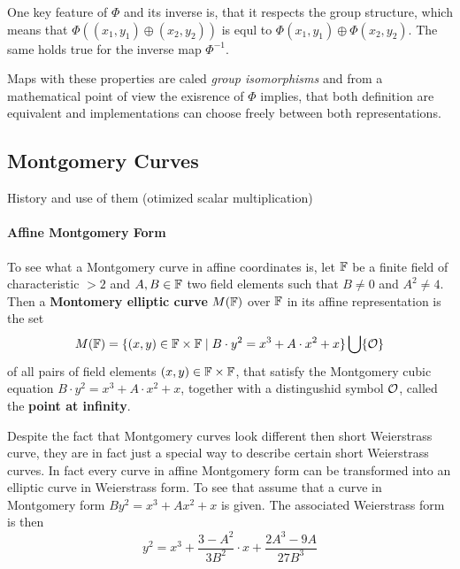 One key feature of $\Phi$ and its inverse is, that it respects the group structure, which means that $\Phi((x_1,y_1)\oplus (x_2,y_2))$ is equl to $\Phi(x_1,y_1)\oplus \Phi(x_2,y_2)$. The same holds true for the inverse map $\Phi^{-1}$.

Maps with these properties are caled \textit{group isomorphisms} and from a mathematical point of view the exisrence of $\Phi$ implies, that both definition are equivalent and implementations can choose freely between both representations. 


\subsection{Montgomery Curves}
History and use of them (otimized scalar multiplication)

\paragraph{Affine Montgomery Form}
To see what a Montgomery curve in affine coordinates is, let $\mathbb{F}$ be a finite field of characteristic $>2$ and $A,B\in \mathbb{F}$ two field elements such that $B\neq 0$ and $A^2 \neq 4$. Then a \textbf{Montomery elliptic curve} $M(\mathbb{F})$ over $\mathbb{F}$ in its affine representation is the set
\begin{equation}
\label{def_short_weierstrass_curve}
M(\mathbb{F}) = \{(x,y)\in \mathbb{F}\times \mathbb{F}\;|\; B\cdot y^2 = x^3 + A\cdot x^2 + x  \} \bigcup \{\mathcal{O}\}
\end{equation}
of all pairs of field elements $(x,y)\in \mathbb{F}\times \mathbb{F}$, that satisfy the Montgomery cubic equation $B\cdot y^2 = x^3 + A\cdot x^2 + x$, together with a distingushid symbol $\mathcal{O}$, called the \textbf{point at infinity}.

Despite the fact that Montgomery curves look different then short Weierstrass curve, they are in fact just a special way to describe certain short Weierstrass curves. In fact every curve in affine Montgomery form can be transformed into an elliptic curve in Weierstrass form. To see that assume that a curve in Montgomery form $B y^2 = x^3 + A x^2 + x$ is given. The associated Weierstrass form is then
$$
y^2 = x^3 + \frac{3-A^2}{3B^2}\cdot x + \frac{2A^3-9A}{27B^3}
$$
 
